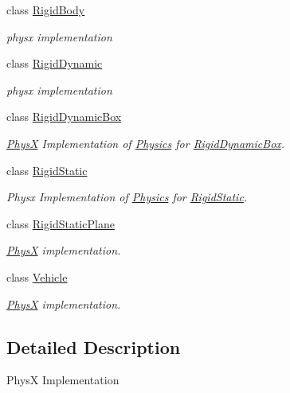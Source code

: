 \begin{DoxyCompactItemize}
class \hyperlink{classContent_1_1Actor_1_1Physics_1_1PhysX_1_1RigidBody}{RigidBody}
\begin{DoxyCompactList}\small\item\em physx implementation \item\end{DoxyCompactList}\item 
class \hyperlink{classContent_1_1Actor_1_1Physics_1_1PhysX_1_1RigidDynamic}{RigidDynamic}
\begin{DoxyCompactList}\small\item\em physx implementation \item\end{DoxyCompactList}\item 
class \hyperlink{classContent_1_1Actor_1_1Physics_1_1PhysX_1_1RigidDynamicBox}{RigidDynamicBox}
\begin{DoxyCompactList}\small\item\em \hyperlink{namespaceContent_1_1Actor_1_1Physics_1_1PhysX}{PhysX} Implementation of \hyperlink{namespaceContent_1_1Actor_1_1Physics}{Physics} for \hyperlink{classContent_1_1Actor_1_1Physics_1_1PhysX_1_1RigidDynamicBox}{RigidDynamicBox}. \item\end{DoxyCompactList}\item 
class \hyperlink{classContent_1_1Actor_1_1Physics_1_1PhysX_1_1RigidStatic}{RigidStatic}
\begin{DoxyCompactList}\small\item\em Physx Implementation of \hyperlink{namespaceContent_1_1Actor_1_1Physics}{Physics} for \hyperlink{classContent_1_1Actor_1_1Physics_1_1PhysX_1_1RigidStatic}{RigidStatic}. \item\end{DoxyCompactList}\item 
class \hyperlink{classContent_1_1Actor_1_1Physics_1_1PhysX_1_1RigidStaticPlane}{RigidStaticPlane}
\begin{DoxyCompactList}\small\item\em \hyperlink{namespaceContent_1_1Actor_1_1Physics_1_1PhysX}{PhysX} implementation. \item\end{DoxyCompactList}\item 
class \hyperlink{classContent_1_1Actor_1_1Physics_1_1PhysX_1_1Vehicle}{Vehicle}
\begin{DoxyCompactList}\small\item\em \hyperlink{namespaceContent_1_1Actor_1_1Physics_1_1PhysX}{PhysX} implementation. \item\end{DoxyCompactList}\end{DoxyCompactItemize}


\subsection{Detailed Description}
PhysX Implementation 